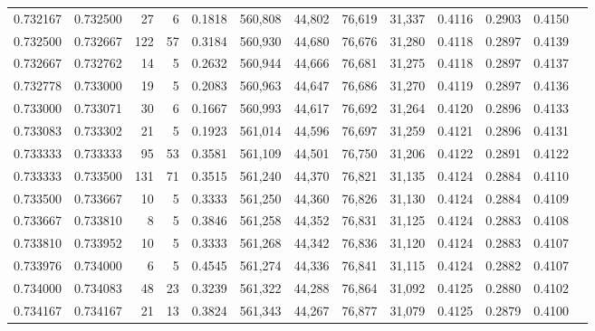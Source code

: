 \begin{tabular}{rrrrrrrrrrrrr}
0.732167 & 0.732500 &    27 &   6 &                                     0.1818 & 560,808 &  44,802 &  76,619 &  31,337 & 0.4116 & 0.2903 & 0.4150 \\
0.732500 & 0.732667 &   122 &  57 &                                     0.3184 & 560,930 &  44,680 &  76,676 &  31,280 & 0.4118 & 0.2897 & 0.4139 \\
0.732667 & 0.732762 &    14 &   5 &                                     0.2632 & 560,944 &  44,666 &  76,681 &  31,275 & 0.4118 & 0.2897 & 0.4137 \\
0.732778 & 0.733000 &    19 &   5 &                                     0.2083 & 560,963 &  44,647 &  76,686 &  31,270 & 0.4119 & 0.2897 & 0.4136 \\
0.733000 & 0.733071 &    30 &   6 &                                     0.1667 & 560,993 &  44,617 &  76,692 &  31,264 & 0.4120 & 0.2896 & 0.4133 \\
0.733083 & 0.733302 &    21 &   5 &                                     0.1923 & 561,014 &  44,596 &  76,697 &  31,259 & 0.4121 & 0.2896 & 0.4131 \\
0.733333 & 0.733333 &    95 &  53 &                                     0.3581 & 561,109 &  44,501 &  76,750 &  31,206 & 0.4122 & 0.2891 & 0.4122 \\
0.733333 & 0.733500 &   131 &  71 &                                     0.3515 & 561,240 &  44,370 &  76,821 &  31,135 & 0.4124 & 0.2884 & 0.4110 \\
0.733500 & 0.733667 &    10 &   5 &                                     0.3333 & 561,250 &  44,360 &  76,826 &  31,130 & 0.4124 & 0.2884 & 0.4109 \\
0.733667 & 0.733810 &     8 &   5 &                                     0.3846 & 561,258 &  44,352 &  76,831 &  31,125 & 0.4124 & 0.2883 & 0.4108 \\
0.733810 & 0.733952 &    10 &   5 &                                     0.3333 & 561,268 &  44,342 &  76,836 &  31,120 & 0.4124 & 0.2883 & 0.4107 \\
0.733976 & 0.734000 &     6 &   5 &                                     0.4545 & 561,274 &  44,336 &  76,841 &  31,115 & 0.4124 & 0.2882 & 0.4107 \\
0.734000 & 0.734083 &    48 &  23 &                                     0.3239 & 561,322 &  44,288 &  76,864 &  31,092 & 0.4125 & 0.2880 & 0.4102 \\
0.734167 & 0.734167 &    21 &  13 &                                     0.3824 & 561,343 &  44,267 &  76,877 &  31,079 & 0.4125 & 0.2879 & 0.4100 \\

\end{tabular}
